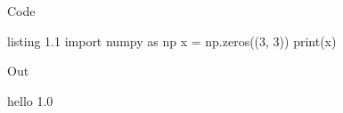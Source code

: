 \documentclass[aspectratio=169,11pt,t]{beamer}
\begin{document}
\begin{frame}[fragile]{Code}
\begin{icode}[python]{listing 1.1}
import numpy as np
x = np.zeros((3, 3))
print(x)
\end{icode}
\end{frame}
\begin{frame}[fragile]{Out}
\begin{ioutput}
hello 1.0
\end{ioutput}
\end{frame}
\end{document}
